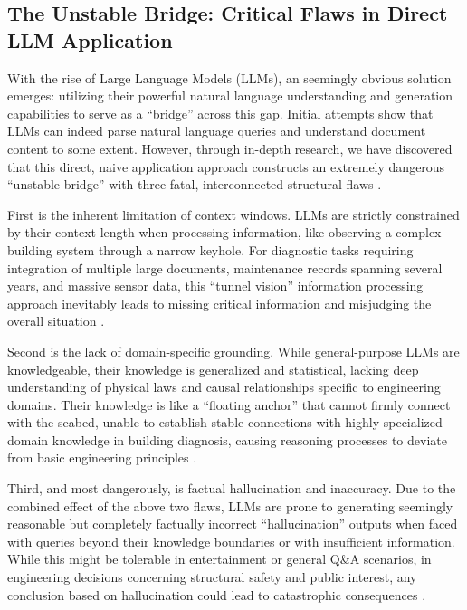 \subsection{The Unstable Bridge: Critical Flaws in Direct LLM Application}

With the rise of Large Language Models (LLMs), an seemingly obvious solution emerges: utilizing their powerful natural language understanding and generation capabilities to serve as a ``bridge'' across this gap. Initial attempts show that LLMs can indeed parse natural language queries and understand document content to some extent. However, through in-depth research, we have discovered that this direct, naive application approach constructs an extremely dangerous ``unstable bridge'' with three fatal, interconnected structural flaws \cite{ji2023survey}.

First is the inherent limitation of context windows. LLMs are strictly constrained by their context length when processing information, like observing a complex building system through a narrow keyhole. For diagnostic tasks requiring integration of multiple large documents, maintenance records spanning several years, and massive sensor data, this ``tunnel vision'' information processing approach inevitably leads to missing critical information and misjudging the overall situation \cite{liu2023lost}.

Second is the lack of domain-specific grounding. While general-purpose LLMs are knowledgeable, their knowledge is generalized and statistical, lacking deep understanding of physical laws and causal relationships specific to engineering domains. Their knowledge is like a ``floating anchor'' that cannot firmly connect with the seabed, unable to establish stable connections with highly specialized domain knowledge in building diagnosis, causing reasoning processes to deviate from basic engineering principles \cite{harnad1990symbol}.

Third, and most dangerously, is factual hallucination and inaccuracy. Due to the combined effect of the above two flaws, LLMs are prone to generating seemingly reasonable but completely factually incorrect ``hallucination'' outputs when faced with queries beyond their knowledge boundaries or with insufficient information. While this might be tolerable in entertainment or general Q\&A scenarios, in engineering decisions concerning structural safety and public interest, any conclusion based on hallucination could lead to catastrophic consequences \cite{zhang2023siren}.

